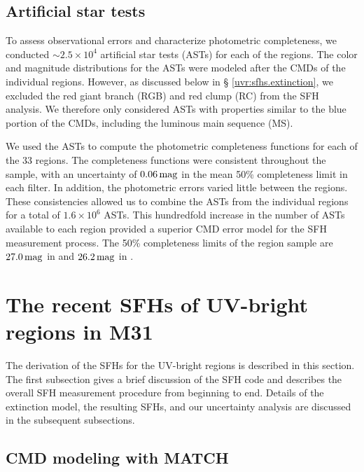 \subsection{Artificial star tests}\label{uvr:observations.asts}

To assess observational errors and characterize photometric completeness, we
conducted $\sim 2.5 \times 10^4$ artificial star tests (ASTs) for each of the
regions. The color and magnitude distributions for the ASTs were modeled after
the CMDs of the individual regions. However, as discussed below in \S
\ref{uvr:sfhs.extinction}, we excluded the red giant branch (RGB) and red clump
(RC) from the SFH analysis. We therefore only considered ASTs with properties
similar to the blue portion of the CMDs, including the luminous main sequence
(MS).

We used the ASTs to compute the photometric completeness functions for each of
the 33 regions. The completeness functions were consistent throughout the
sample, with an uncertainty of $0.06\,\mathrm{mag}$ in the mean 50\%
completeness limit in each filter. In addition, the photometric errors varied
little between the regions. These consistencies allowed us to combine the ASTs
from the individual regions for a total of $1.6 \times 10^6$ ASTs. This
hundredfold increase in the number of ASTs available to each region provided a
superior CMD error model for the SFH measurement process. The 50\% completeness
limits of the region sample are $27.0\,\mathrm{mag}$ in \acsb{} and
$26.2\,\mathrm{mag}$ in \acsi{}.





\section{The recent SFHs of UV-bright regions in M31}\label{uvr:sfhs}

The derivation of the SFHs for the UV-bright regions is described in this
section. The first subsection gives a brief discussion of the SFH code and
describes the overall SFH measurement procedure from beginning to end. Details
of the extinction model, the resulting SFHs, and our uncertainty analysis are
discussed in the subsequent subsections.



\subsection{CMD modeling with MATCH}\label{uvr:sfhs.measurement}

